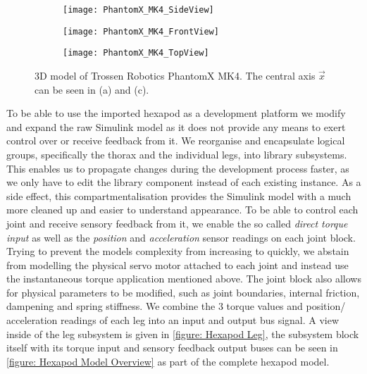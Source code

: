 \begin{figure}[h]
	\begin{subfigure}{.5\textwidth} %
		\centering
		\texttt{[image: PhantomX\_MK4\_SideView]}  %
		\caption{}
		\label{figure: PhantomX Side View}
	\end{subfigure}
	\begin{subfigure}{.5\textwidth}
		\centering
		\texttt{[image: PhantomX\_MK4\_FrontView]}  
		\caption{}
		\label{figure: PhantomX Front View}
	\end{subfigure}
	
	\label{fig:fig}
	\begin{subfigure}{\textwidth}
		\centering
		\texttt{[image: PhantomX\_MK4\_TopView]}   %
		\caption{}
		\label{figure: PhantomX Top View}
	\end{subfigure}
	\caption[Trossen Robotics PhantomX MKIV]{3D model of Trossen Robotics PhantomX MK4. The central axis $\vec{x}$ can be seen in (a) and (c).}
	\label{figure: PhantomX 3D model}
\end{figure}

To be able to use the imported hexapod as a development platform we modify and expand the raw Simulink model as it does not provide any means to exert control over or receive feedback from it.
We reorganise and encapsulate logical groups, specifically the thorax and the individual legs, into library subsystems.
This enables us to propagate changes during the development process faster, as we only have to edit the library component instead of each existing instance.
As a side effect, this compartmentalisation provides the Simulink model with a much more cleaned up and easier to understand appearance.
To be able to control each joint and receive sensory feedback from it, we enable the so called \textit{direct torque input} as well as the \textit{position} and \textit{acceleration} sensor readings on each joint block.
Trying to prevent the models complexity from increasing to quickly, we abstain from modelling the physical servo motor attached to each joint and instead use the instantaneous torque application mentioned above.
The joint block also allows for physical parameters to be modified, such as joint boundaries, internal friction, dampening and spring stiffness.
We combine the 3 torque values and position/ acceleration readings of each leg into an input and output bus signal.
A view inside of the leg subsystem is given in \ref{figure: Hexapod Leg}, the subsystem block itself with its torque input and sensory feedback output buses can be seen in \ref{figure: Hexapod Model Overview} as part of the complete hexapod model.

